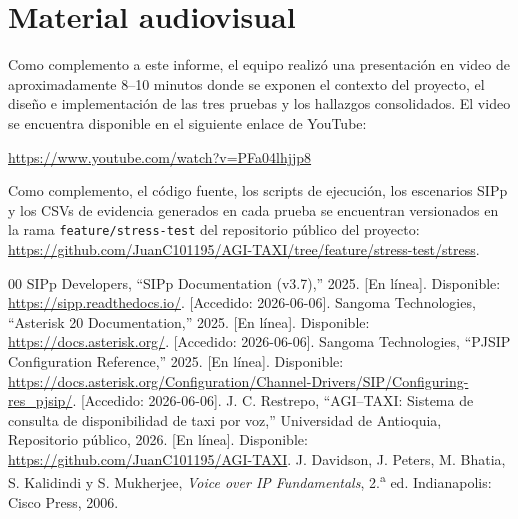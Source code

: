 \documentclass[conference]{IEEEtran}
\begin{document}
\section*{Material audiovisual}

Como complemento a este informe, el equipo realiz\'o una
presentaci\'on en video de aproximadamente 8--10 minutos donde se
exponen el contexto del proyecto, el dise\~no e implementaci\'on de
las tres pruebas y los hallazgos consolidados. El video se encuentra
disponible en el siguiente enlace de YouTube:

\begin{center}
\url{https://www.youtube.com/watch?v=PFa04lhjjp8}
\end{center}

\noindent Como complemento, el c\'odigo fuente, los scripts de
ejecuci\'on, los escenarios SIPp y los CSVs de evidencia generados en
cada prueba se encuentran versionados en la rama
\texttt{feature/stress-test} del repositorio p\'ublico del proyecto:
\url{https://github.com/JuanC101195/AGI-TAXI/tree/feature/stress-test/stress}.

\begin{thebibliography}{00}
 SIPp Developers, ``SIPp Documentation (v3.7),''
2025. [En l\'inea]. Disponible: \url{https://sipp.readthedocs.io/}.
[Accedido: 2026-06-06].
 Sangoma Technologies, ``Asterisk 20
Documentation,'' 2025. [En l\'inea]. Disponible:
\url{https://docs.asterisk.org/}. [Accedido: 2026-06-06].
 Sangoma Technologies, ``PJSIP Configuration
Reference,'' 2025. [En l\'inea]. Disponible:
\url{https://docs.asterisk.org/Configuration/Channel-Drivers/SIP/Configuring-res_pjsip/}.
[Accedido: 2026-06-06].
 J. C. Restrepo, ``AGI--TAXI: Sistema de consulta
de disponibilidad de taxi por voz,'' Universidad de Antioquia,
Repositorio p\'ublico, 2026. [En l\'inea]. Disponible:
\url{https://github.com/JuanC101195/AGI-TAXI}.
 J. Davidson, J. Peters, M. Bhatia,
S. Kalidindi y S. Mukherjee, \textit{Voice over IP Fundamentals},
2.\textsuperscript{a} ed. Indianapolis: Cisco Press, 2006.
\end{thebibliography}
\end{document}
